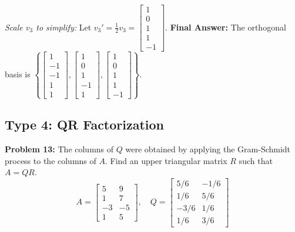 \documentclass[11pt, letterpaper]{article}
\theoremstyle{definition}
\theoremstyle{remark}
\begin{document}
\textit{Scale $v_3$ to simplify:} Let $v_3' = \frac{1}{2}v_3 = \begin{bmatrix} 1 \\ 0 \\ 1 \\ 1 \\ -1 \end{bmatrix}$.
\textbf{Final Answer:} The orthogonal basis is $\left\{ \begin{bmatrix} 1 \\ -1 \\ -1 \\ 1 \\ 1 \end{bmatrix}, \begin{bmatrix} 1 \\ 0 \\ 1 \\ -1 \\ 1 \end{bmatrix}, \begin{bmatrix} 1 \\ 0 \\ 1 \\ 1 \\ -1 \end{bmatrix} \right\}$.

\subsection{Type 4: QR Factorization}

\textbf{Problem 13:} 
The columns of $Q$ were obtained by applying the Gram-Schmidt process to the columns of $A$. Find an upper triangular matrix $R$ such that $A = QR$.
\[ A = \begin{bmatrix} 5 & 9 \\ 1 & 7 \\ -3 & -5 \\ 1 & 5 \end{bmatrix}, \quad Q = \begin{bmatrix} 5/6 & -1/6 \\ 1/6 & 5/6 \\ -3/6 & 1/6 \\ 1/6 & 3/6 \end{bmatrix} \]
\end{document}
